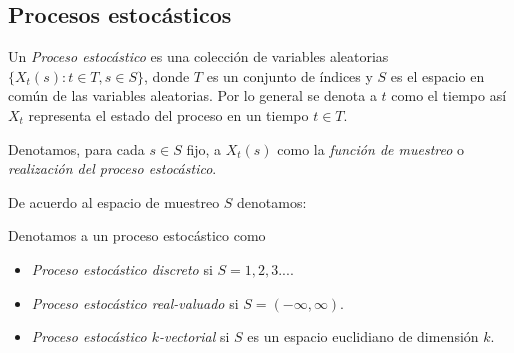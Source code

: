     \subsection{Procesos estocásticos}
    \begin{definition}
        Un \textit{Proceso estocástico} es una colección de variables aleatorias \( \{X_t(s): t \in T, s \in S \} \), donde $T$ es un conjunto de índices y $S$ es el espacio en común de las variables aleatorias. Por lo general se denota a $t$ como el tiempo así $X_t$ representa el estado del proceso en un tiempo $t \in T$.
    \end{definition}
    \begin{definition}
        Denotamos, para cada $s \in S$ fijo, a  $X_t(s)$ como la \textit{función de muestreo} o \textit{realización del proceso estocástico}.
    \end{definition}
    De acuerdo al espacio de muestreo $S$ denotamos:
    \begin{definition} Denotamos a un proceso estocástico como 
        \begin{itemize}
            \item \textit{Proceso estocástico discreto} si  $S=1,2,3...$.
            \item \textit{Proceso estocástico real-valuado} si \( S= (-\infty,\infty) \).
            \item \textit{Proceso estocástico $k$-vectorial} si $S$ es un espacio euclidiano de dimensión $k$.
        \end{itemize}
    \end{definition}
    
